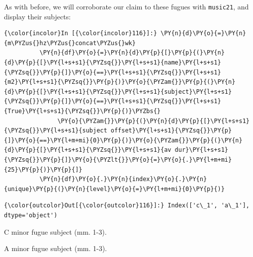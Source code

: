 As with before, we will corroborate our claim to these fugues with
\texttt{music21}, and display their subjects:

    \begin{Verbatim}[commandchars=\\\{\}]
{\color{incolor}In [{\color{incolor}116}]:} \PY{n}{d}\PY{o}{=}\PY{n}{m\PYZus{}hz\PYZus{}concat\PYZus{}wk}
          \PY{n}{df}\PY{o}{=}\PY{n}{d}\PY{p}{[}\PY{p}{(}\PY{n}{d}\PY{p}{[}\PY{l+s+s1}{\PYZsq{}}\PY{l+s+s1}{name}\PY{l+s+s1}{\PYZsq{}}\PY{p}{]}\PY{o}{==}\PY{l+s+s1}{\PYZsq{}}\PY{l+s+s1}{m2}\PY{l+s+s1}{\PYZsq{}}\PY{p}{)}\PY{o}{\PYZam{}}\PY{p}{(}\PY{n}{d}\PY{p}{[}\PY{l+s+s1}{\PYZsq{}}\PY{l+s+s1}{subject}\PY{l+s+s1}{\PYZsq{}}\PY{p}{]}\PY{o}{==}\PY{l+s+s1}{\PYZsq{}}\PY{l+s+s1}{True}\PY{l+s+s1}{\PYZsq{}}\PY{p}{)}\PYZbs{}
               \PY{o}{\PYZam{}}\PY{p}{(}\PY{n}{d}\PY{p}{[}\PY{l+s+s1}{\PYZsq{}}\PY{l+s+s1}{subject offset}\PY{l+s+s1}{\PYZsq{}}\PY{p}{]}\PY{o}{==}\PY{l+m+mi}{0}\PY{p}{)}\PY{o}{\PYZam{}}\PY{p}{(}\PY{n}{d}\PY{p}{[}\PY{l+s+s1}{\PYZsq{}}\PY{l+s+s1}{av dur}\PY{l+s+s1}{\PYZsq{}}\PY{p}{]}\PY{o}{\PYZlt{}}\PY{o}{=}\PY{o}{.}\PY{l+m+mi}{25}\PY{p}{)}\PY{p}{]}
          \PY{n}{df}\PY{o}{.}\PY{n}{index}\PY{o}{.}\PY{n}{unique}\PY{p}{(}\PY{n}{level}\PY{o}{=}\PY{l+m+mi}{0}\PY{p}{)}
\end{Verbatim}
\begin{Verbatim}[commandchars=\\\{\}]
{\color{outcolor}Out[{\color{outcolor}116}]:} Index(['c\_1', 'a\_1'], dtype='object')
\end{Verbatim}


\begin{Example}[H]
    \begin{center}
    \caption{ C minor fugue subject (mm. 1-3). }
    \end{center}
\end{Example}
    


\begin{Example}[H]
    \begin{center}
    \caption{ A minor fugue subject (mm. 1-3). }
    \end{center}
\end{Example}
    
